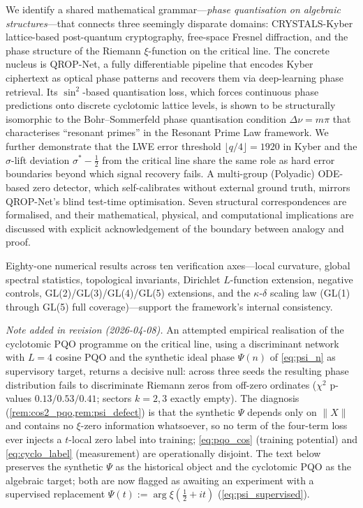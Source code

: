 \documentclass[11pt, a4paper]{article}
\theoremstyle{definition}
\theoremstyle{plain}
\newcommand{\xif}{\xi}                      %
\newcommand{\Psip}{\Psi}                    %
\begin{document}
\begin{tcolorbox}[
  colback=lightbg, colframe=zetaviolet!60!black,
  title={\bfseries Abstract}, fonttitle=\large,
  arc=3pt, boxrule=0.8pt, toptitle=3pt, bottomtitle=3pt
]
We identify a shared mathematical grammar---\textit{phase quantisation on
algebraic structures}---that connects three seemingly disparate domains:
CRYSTALS-Kyber lattice-based post-quantum cryptography, free-space Fresnel
diffraction, and the phase structure of the Riemann $\xif$-function on the
critical line. The concrete nucleus is QROP-Net, a fully differentiable
pipeline that encodes Kyber ciphertext as optical phase patterns and
recovers them via deep-learning phase retrieval. Its $\sin^2$-based
quantisation loss, which forces continuous phase predictions onto discrete
cyclotomic lattice levels, is shown to be structurally isomorphic to the
Bohr--Sommerfeld phase quantisation condition $\Delta\nu = m\pi$ that
characterises ``resonant primes'' in the Resonant Prime Law framework. We
further demonstrate that the LWE error threshold $\lfloor q/4\rfloor = 1920$
in Kyber and the $\sigma$-lift deviation $\sigma^*-\tfrac{1}{2}$ from the
critical line share the same role as hard error boundaries beyond which
signal recovery fails. A multi-group (Polyadic) ODE-based zero detector,
which self-calibrates without external ground truth, mirrors QROP-Net's
blind test-time optimisation. Seven structural correspondences are
formalised, and their mathematical, physical, and computational
implications are discussed with explicit acknowledgement of the boundary
between analogy and proof.

\smallskip
\noindent Eighty-one numerical results across ten verification
axes---local curvature, global spectral statistics, topological
invariants, Dirichlet $L$-function extension, negative
controls, GL(2)/GL(3)/GL(4)/GL(5) extensions, and the $\kappa$-$\delta$
scaling law (GL(1) through GL(5) full coverage)---support the
framework's internal consistency.

\smallskip
\noindent\textit{Note added in revision (2026-04-08).} An attempted
empirical realisation of the cyclotomic PQO programme on the critical
line, using a discriminant network with $L=4$ cosine PQO and the
synthetic ideal phase $\Psip(n)$ of \cref{eq:psi_n} as supervisory
target, returns a decisive null: across three seeds the resulting
phase distribution fails to discriminate Riemann zeros from off-zero
ordinates ($\chi^2$ p-values $0.13/0.53/0.41$; sectors $k=2,3$ exactly
empty). The diagnosis (\cref{rem:cos2_pqo,rem:psi_defect}) is that the
synthetic $\Psip$ depends only on $\|X\|$ and contains no
$\xif$-zero information whatsoever, so no term of the four-term loss
ever injects a $t$-local zero label into training; \cref{eq:pqo_cos}
(training potential) and \cref{eq:cyclo_label} (measurement) are
operationally disjoint. The text below preserves the synthetic
$\Psip$ as the historical object and the cyclotomic PQO as the
algebraic target; both are now flagged as awaiting an experiment
with a supervised replacement
$\Psip(t) := \arg\xif(\tfrac{1}{2}+it)$ (\cref{eq:psi_supervised}).
\end{tcolorbox}
\end{document}
